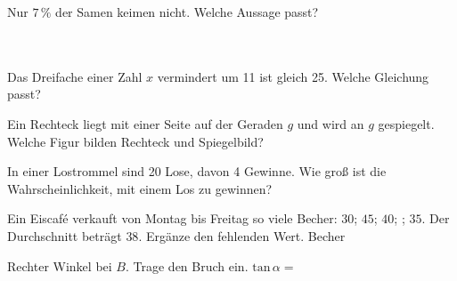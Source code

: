 \documentclass[11pt]{article}
\begin{document}
\begin{aufgabe}{Nur $7\,\%$ der Samen keimen nicht. Welche Aussage passt?\\ \\ \\ }
\end{aufgabe}

\begin{aufgabe}{Das Dreifache einer Zahl $x$ vermindert um 11 ist gleich 25. Welche Gleichung passt? \\    }
\end{aufgabe}

\begin{aufgabe}{Ein Rechteck liegt mit einer Seite auf der Geraden $g$ und wird an $g$ gespiegelt. Welche Figur bilden Rechteck und Spiegelbild?}
\end{aufgabe}

\begin{aufgabe}{In einer Lostrommel sind 20 Lose, davon 4 Gewinne. Wie groß ist die Wahrscheinlichkeit, mit einem Los zu gewinnen? \leerfeld}
\end{aufgabe}

\begin{aufgabe}{Ein Eiscafé verkauft von Montag bis Freitag so viele Becher: $30$; $45$; $40$; \underline{\hspace{1cm}}; $35$. Der Durchschnitt beträgt $38$. Ergänze den fehlenden Wert. \leerfeld Becher}
\end{aufgabe}

\begin{aufgabe}{\begin{minipage}[t]{0.6\linewidth}Rechter Winkel bei $B$. Trage den Bruch ein. $\mathrm{tan}\,\alpha =$ \leerfeld\end{minipage}\hfill\begin{minipage}[t]{0.37\linewidth}\vspace{0pt}
\end{minipage}}
\end{aufgabe}
\end{document}
